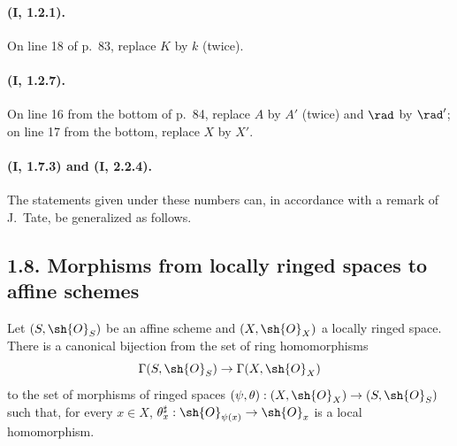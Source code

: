 \paragraph{(I, 1.2.1).}
On line 18 of p.~83, replace $K$ by $k$ (twice).

\paragraph{(I, 1.2.7).}
On line 16 from the bottom of p.~84, replace $A$ by $A'$ (twice) and
$\rad$ by $\rad'$; on line 17 from the bottom, replace
$X$ by $X'$.

\paragraph{(I, 1.7.3) and (I, 2.2.4).}
The statements given under these numbers can, in accordance with a
remark of J.~Tate, be generalized as follows.

\subsection*{1.8. Morphisms from locally ringed spaces to affine schemes}
\label{subsection:I.1.8}

\begin{proposition}[1.8.1]
\label{I.1.8.1}
Let $(S,\sh{O}_S)$ be an affine scheme and $(X,\sh{O}_X)$ a locally
ringed space.  There is a canonical bijection from the set of ring
homomorphisms
\[
  \Gamma(S,\sh{O}_S)\to\Gamma(X,\sh{O}_X)
\]
to the set of morphisms of ringed spaces
$(\psi,\theta):(X,\sh{O}_X)\to(S,\sh{O}_S)$ such that, for every
$x\in X$, $\theta_x^\sharp:\sh{O}_{\psi(x)}\to\sh{O}_x$ is a local
homomorphism.
\end{proposition}

